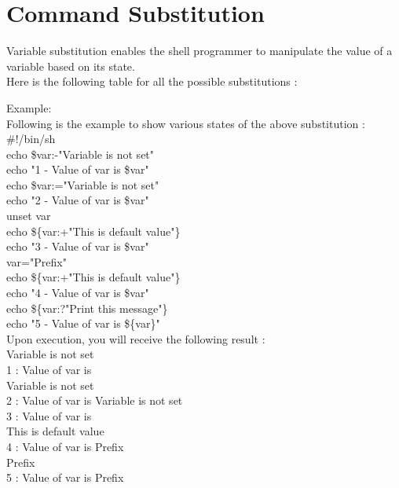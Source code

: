 \documentclass{article}
\begin{document}
\section*{Command Substitution}
Variable substitution enables the shell programmer to manipulate the value of a variable based on its state.\\
Here is the following table for all the possible substitutions :\\
\begin{center}
\end{center}
Example:\\
Following is the example to show various states of the above substitution :\\
\#!/bin/sh\\
echo \${var:-"Variable is not set"}\\
echo "1 - Value of var is \${var}"\\
echo \${var:="Variable is not set"}\\
echo "2 - Value of var is \${var}"\\
unset var\\
echo \$\{var:+"This is default value"\}\\
echo "3 - Value of var is \$var"\\
var="Prefix"\\
echo \$\{var:+"This is default value"\}\\
echo "4 - Value of var is \$var"\\
echo \$\{var:?"Print this message"\}\\
echo "5 - Value of var is \$\{var\}"\\
Upon execution, you will receive the following result :\\
Variable is not set\\
1 : Value of var is\\
Variable is not set\\
2 : Value of var is Variable is not set\\
3 : Value of var is\\
This is default value\\
4 : Value of var is Prefix\\
Prefix\\
5 : Value of var is Prefix
\end{document}
